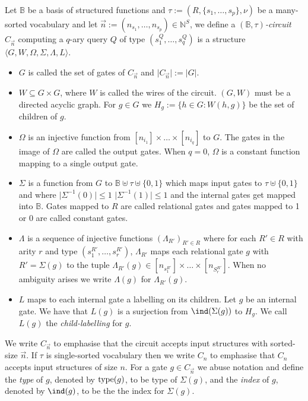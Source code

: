 \documentclass[../paper.tex]{subfiles}
\begin{document}
\begin{definition}
  Let $\mathbb{B}$ be a basis of structured functions and $\tau := (R, \{s_1,
  \ldots, s_p\}, \nu)$ be a many-sorted vocabulary and let $\vec{n} := (n_{s_1},
  \ldots , n_{s_p}) \in \mathbb{N}^{S}$, we define a \emph{$(\mathbb{B},
    \tau)$-circuit} $C_{\vec{n}}$ computing a $q$-ary query $Q$ of type
  $(s^Q_{1}, \ldots , s^Q_{q})$ is a structure $\langle G, W, \Omega, \Sigma,
  \Lambda, L\rangle$.
  \begin{itemize}
    \setlength\itemsep{0mm}
  \item $G$ is called the set of gates of $C_{\vec{n}}$ and $\vert C_{\vec{n}}
    \vert := \vert G \vert$.
  \item $W \subseteq G \times G$, where $W$ is called the wires of the circuit.
    $(G,W)$ must be a directed acyclic graph. For $g \in G$ we $H_g := \{ h \in
    G: W(h,g)\}$ be the set of children of $g$.
  \item $\Omega$ is an injective function from $[n_{i_1}] \times \ldots \times
    [n_{i_q}]$ to $G$. The gates in the image of $\Omega$ are called the output
    gates. When $q = 0$, $\Omega$ is a constant function mapping to a single
    output gate.
  \item $\Sigma$ is a function from $G$ to $\mathbb{B} \uplus \tau \uplus
    \{0,1\} $ which maps input gates to $\tau \uplus \{0,1\}$ and where $\vert
    \Sigma^{-1} (0) \vert \leq 1$ $\vert \Sigma^{-1} (1) \vert \leq 1$ and the
    internal gates get mapped into $\mathbb{B}$. Gates mapped to $R$ are called
    relational gates and gates mapped to 1 or 0 are called constant gates.
  \item $\Lambda$ is a sequence of injective functions $(\Lambda_{R'})_{R' \in
      R}$ where for each $R' \in R$ with arity $r$ and type $(s^{R'}_{1},
    \ldots, s^{R'}_{r})$, $\Lambda_{R'}$ maps each relational gate $g$ with $R'
    = \Sigma (g)$ to the tuple $\Lambda_{R'} (g) \in [n_{s^{R'}_1}] \times
    \ldots \times [n_{S^{R'}_r}]$. When no ambiguity arises we write $\Lambda
    (g)$ for $\Lambda_{R'} (g)$.
  \item $L$ maps to each internal gate a labelling on its children. Let $g$ be
    an internal gate. We have that $L(g)$ is a surjection from $\ind (\Sigma (g))$
    to $H_g$. We call $L(g)$ the \emph{child-labelling} for $g$.
  \end{itemize}
\end{definition}

We write $C_{\vec{n}}$ to emphasise that the circuit accepts input structures
with sorted-size $\vec{n}$. If $\tau$ is single-sorted vocabulary then we write
$C_n$ to emphasise that $C_n$ accepts input structures of size $n$. For a gate
$g \in C_{\vec{n}}$ we abuse notation and define the \emph{type} of $g$, denoted
by $\text{type} (g)$, to be type of $\Sigma(g)$, and the \emph{index} of $g$, denoted by
$\ind(g)$, to be the the index for $\Sigma(g)$.
\end{document}
